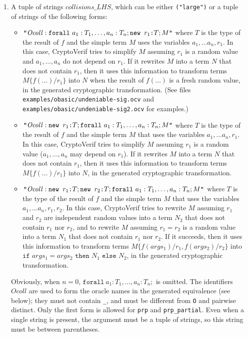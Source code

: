 \begin{itemize}
\begin{enumerate}
\item A tuple of strings $\mathit{collisions\_LHS}$, which can be either \texttt{("large")} or a tuple of strings of the following forms:
  \begin{itemize}
  \item $\texttt{"}\mathit{Ocoll}: \texttt{forall}\ a_1:T_1, \dots, a_n:T_n; \texttt{new\ }{r_1}\texttt{:}{T}; M\texttt{"}$
    where $T$ is the type of the result of $f$ and the simple term $M$ uses the variables $a_1, \dots a_n, r_1$. In this case, CryptoVerif tries
    to simplify $M$ assuming $r_1$ is a random value and $a_1, \dots, a_n$ do not depend on $r_1$. If it
    rewrites $M$ into a term $N$ that does not contain $r_1$, then it uses this information to transform
    terms $M\{f(\dots)/r_1\}$ into $N$ when the result of $f(\dots)$ is a fresh random value, in the generated
    cryptographic transformation. (See files \nolinkurl{examples/obasic/undeniable-sig.ocv} and
    \nolinkurl{examples/obasic/undeniable-sig2.ocv} for examples.)
  \item $\texttt{"}\mathit{Ocoll}: \texttt{new\ }{r_1}\texttt{:}{T}; \texttt{forall}\ a_1:T_1, \dots, a_n:T_n; M\texttt{"}$
    where $T$ is the type of the result of $f$ and the simple term $M$ that uses the variables $a_1, \dots a_n, r_1$. In this case, CryptoVerif tries
    to simplify $M$ assuming $r_1$ is a random value ($a_1, \dots, a_n$ may depend on $r_1$). 
    If it rewrites $M$ into a term $N$ that does not contain $r_1$, then it uses this information to transform
    terms $M\{f(\dots)/r_1\}$ into $N$, in the generated cryptographic transformation.
  \item $\texttt{"}\mathit{Ocoll}: \texttt{new\ }{r_1}\texttt{:}{T}; \texttt{new\ }{r_2}\texttt{:}{T}; \texttt{forall}\ a_1:T_1, \dots, a_n:T_n; M\texttt{"}$
    where $T$ is the type of the result of $f$ and the simple term $M$ that uses the variables $a_1, \dots a_n, r_1, r_2$. In this case, CryptoVerif tries
to rewrite $M$ assuming $r_1$ and $r_2$ are independent random values into a term $N_2$ that does not contain $r_1$ nor $r_2$,
and to rewrite $M$ assuming $r_1 = r_2$ is a random value into a term $N_1$ that does not contain $r_1$ nor $r_2$.
If it succeeds, then it uses this information to transform terms $M\{f(args_1)/r_1, f(args_2)/r_2\}$ into
$\texttt{if }args_1 = args_2 \texttt{ then }N_1\texttt{ else }N_2$, in the generated cryptographic transformation.
  \end{itemize}
  Obviously, when $n = 0$, $\texttt{forall}\ a_1:T_1, \dots, a_n:T_n; $ is omitted.
  The identifiers $\mathit{Ocoll}$ are used to form the oracle names in the generated equivalence (see below); they must not contain \texttt{\_}, and must be different from \texttt{O} and pairwise distinct.
  Only the first form is allowed for \texttt{prp} and \texttt{prp\_partial}.
  Even when a single string is present, the argument must be a tuple of strings,
  so this string must be between parentheses.


\end{enumerate}
\end{itemize}
